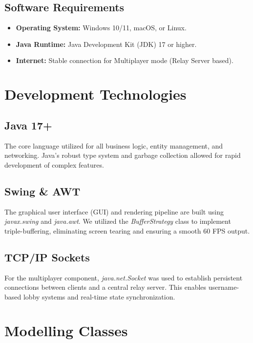 \documentclass[a4paper,12pt]{article}
\begin{document}
\subsection{Software Requirements}
\begin{itemize}
    \item \textbf{Operating System:} Windows 10/11, macOS, or Linux.
    \item \textbf{Java Runtime:} Java Development Kit (JDK) 17 or higher.
    \item \textbf{Internet:} Stable connection for Multiplayer mode (Relay Server based).
\end{itemize}

\section{Development Technologies}

\subsection{Java 17+}
The core language utilized for all business logic, entity management, and networking. Java's robust type system and garbage collection allowed for rapid development of complex features.

\subsection{Swing \& AWT}
The graphical user interface (GUI) and rendering pipeline are built using \textit{javax.swing} and \textit{java.awt}. We utilized the \textit{BufferStrategy} class to implement triple-buffering, eliminating screen tearing and ensuring a smooth 60 FPS output.

\subsection{TCP/IP Sockets}
For the multiplayer component, \textit{java.net.Socket} was used to establish persistent connections between clients and a central relay server. This enables username-based lobby systems and real-time state synchronization.

\newpage

\section{Modelling Classes}
\end{document}
